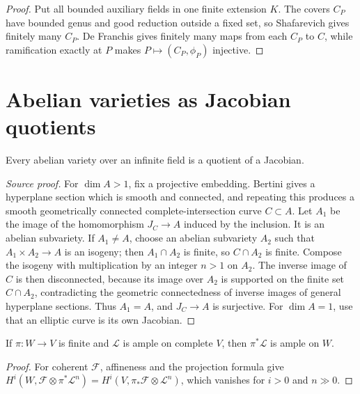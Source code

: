 \begin{proof}

Put all bounded auxiliary fields in one finite extension $K$.  The covers $C_P$
have bounded genus and good reduction outside a fixed set, so Shafarevich gives
finitely many $C_P$.  De Franchis gives finitely many maps from each $C_P$ to
$C$, while ramification exactly at $P$ makes $P\mapsto(C_P,\phi_P)$ injective.

\end{proof}


\section{Abelian varieties as Jacobian quotients}
\begin{theorem}
\label{thm:milne-abelian-is-jacobian-quotient-source}

Every abelian variety over an infinite field is a quotient of a Jacobian.
\end{theorem}

\begin{proof}[Source proof]
For $\dim A>1$, fix a projective embedding.  Bertini gives a hyperplane
section which is smooth and connected, and repeating this produces a smooth
geometrically connected complete-intersection curve $C\subset A$.  Let
$A_1$ be the image of the homomorphism $J_C\to A$ induced by the inclusion.
It is an abelian subvariety.  If $A_1\ne A$, choose an abelian subvariety
$A_2$ such that $A_1\times A_2\to A$ is an isogeny; then $A_1\cap A_2$ is
finite, so $C\cap A_2$ is finite.  Compose the isogeny with multiplication by
an integer $n>1$ on $A_2$.  The inverse image of $C$ is then disconnected,
because its image over $A_2$ is supported on the finite set $C\cap A_2$,
contradicting the geometric connectedness of inverse images of general
hyperplane sections.  Thus $A_1=A$, and $J_C\to A$ is surjective.  For
$\dim A=1$, use that an elliptic curve is its own Jacobian.
\end{proof}


\begin{lemma}
\label{lem:milne-finite-pullback-ample-source}

If $\pi:W\to V$ is finite and $\mathcal L$ is ample on complete $V$, then
$\pi^*\mathcal L$ is ample on $W$.
\end{lemma}

\begin{proof}

For coherent $\mathcal F$, affineness and the projection formula give
$H^i(W,\mathcal F\otimes\pi^*\mathcal L^n)=H^i(V,\pi_*\mathcal F\otimes\mathcal L^n)$,
which vanishes for $i>0$ and $n\gg0$.

\end{proof}


